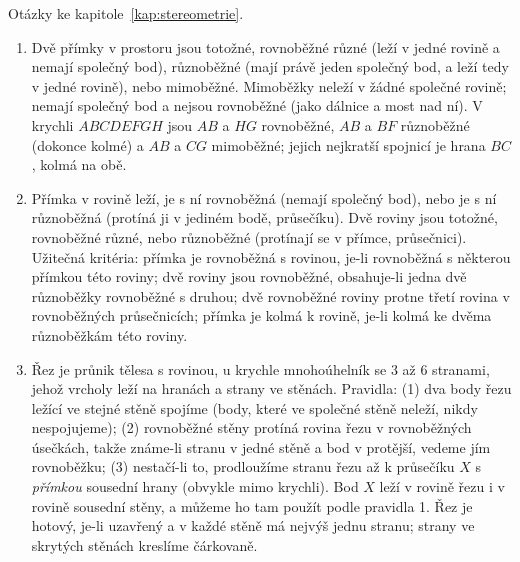 Otázky ke kapitole~\ref{kap:stereometrie}.

\begin{enumerate}[label=\textbf{\arabic*.}, leftmargin=*, itemsep=0.8em]
  \item {}
  Dvě přímky v prostoru jsou totožné, rovnoběžné různé (leží v jedné rovině a nemají společný bod), různoběžné (mají právě jeden společný bod, a leží tedy v jedné rovině), nebo mimoběžné. Mimoběžky neleží v žádné společné rovině; nemají společný bod a nejsou rovnoběžné (jako dálnice a most nad ní). V krychli $ABCDEFGH$ jsou $AB$ a $HG$ rovnoběžné, $AB$ a $BF$ různoběžné (dokonce kolmé) a $AB$ a $CG$ mimoběžné; jejich nejkratší spojnicí je hrana $BC$, kolmá na obě.
  \begin{center}
  \end{center}

  \item {}
  Přímka v rovině leží, je s ní rovnoběžná (nemají společný bod), nebo je s ní různoběžná (protíná ji v jediném bodě, průsečíku). Dvě roviny jsou totožné, rovnoběžné různé, nebo různoběžné (protínají se v přímce, průsečnici). Užitečná kritéria: přímka je rovnoběžná s rovinou, je-li rovnoběžná s některou přímkou této roviny; dvě roviny jsou rovnoběžné, obsahuje-li jedna dvě různoběžky rovnoběžné s druhou; dvě rovnoběžné roviny protne třetí rovina v rovnoběžných průsečnicích; přímka je kolmá k rovině, je-li kolmá ke dvěma různoběžkám této roviny.

  \item {}
  Řez je průnik tělesa s rovinou, u krychle mnohoúhelník se $3$ až $6$ stranami, jehož vrcholy leží na hranách a strany ve stěnách. Pravidla: (1) dva body řezu ležící ve stejné stěně spojíme (body, které ve společné stěně neleží, nikdy nespojujeme); (2) rovnoběžné stěny protíná rovina řezu v rovnoběžných úsečkách, takže známe-li stranu v jedné stěně a bod v protější, vedeme jím rovnoběžku; (3) nestačí-li to, prodloužíme stranu řezu až k průsečíku $X$ s \emph{přímkou} sousední hrany (obvykle mimo krychli). Bod $X$ leží v rovině řezu i v rovině sousední stěny, a můžeme ho tam použít podle pravidla 1. Řez je hotový, je-li uzavřený a v každé stěně má nejvýš jednu stranu; strany ve skrytých stěnách kreslíme čárkovaně. 


\end{enumerate}
